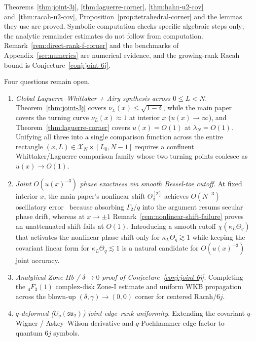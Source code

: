\documentclass[11pt]{article}
\theoremstyle{definition}
\theoremstyle{remark}
\newcommand{\cX}{\mathcal{X}}
\renewcommand{\_}{\oldunderscore\penalty0\hskip0pt\relax}
\begin{document}
Theorems~\ref{thm:joint-3j}, \ref{thm:laguerre-corner}, \ref{thm:hahn-u2-cov} and~\ref{thm:racah-u2-cov},
  Proposition~\ref{prop:tetrahedral-corner} and the lemmas they use are proved. Symbolic computation checks specific algebraic
  steps only; the analytic remainder estimates do not follow from computation. Remark~\ref{rem:direct-rank-f-corner} and the
  benchmarks of Appendix~\ref{sec:numerics} are numerical evidence, and the growing-rank Racah bound is
  Conjecture~\ref{conj:joint-6j}.

Four questions remain open.
\begin{enumerate}[leftmargin=2em,itemsep=2pt]
\item \emph{Global Laguerre--Whittaker + Airy synthesis across $0\le L<N$}.
  Theorem~\ref{thm:joint-3j} covers $\nu_L(x)\le\sqrt{1-\delta}$, while the main paper~\cite[Theorem~4.6]{LewisGrowingRank} covers the
  turning curve $\nu_L(x)\approx 1$ at interior $x$ ($u(x)\to\infty$), and Theorem~\ref{thm:laguerre-corner} covers $u(x)=O(1)$
  at $\lambda_N=O(1)$. Unifying all three into a single comparison function across the entire rectangle
  $(x,L)\in\cX_N\times[L_0,N-1]$ requires a confluent Whittaker/Laguerre comparison family whose two turning points coalesce as
  $u(x)\to O(1)$.
\item \emph{Joint $O(u(x)^{-3})$ phase exactness via smooth Bessel-toe cutoff}. At fixed interior
  $x$, the main paper's nonlinear shift $\Theta_q^{[2]}$ achieves $O(N^{-3})$ oscillatory error~\cite[Corollary~4.4]{LewisGrowingRank}
  because absorbing $\Gamma_2/q$ into the argument resums secular phase drift, whereas at $x\to\pm 1$
  Remark~\ref{rem:nonlinear-shift-failure} proves an unattenuated shift fails at $O(1)$. Introducing a smooth cutoff
  $\chi(\kappa_L\Theta_q)$ that activates the nonlinear phase shift only for $\kappa_L\Theta_q\gtrsim 1$ while keeping the
  covariant linear form for $\kappa_L\Theta_q\lesssim 1$ is a natural candidate for $O(u(x)^{-3})$ joint accuracy.
\item \emph{Analytical Zone-IIb / $\delta\to 0$ proof of Conjecture~\ref{conj:joint-6j}}.
  Completing the ${}_4F_3(1)$ complex-disk Zone-I estimate and uniform WKB propagation across the blown-up
  $(\delta,\gamma)\to(0,0)$ corner for centered Racah/$6j$.
\item \emph{$q$-deformed ($U_q(\mathfrak{su}_2)$) joint edge--rank uniformity}. Extending the
  covariant $q$-Wigner / Askey--Wilson derivative and $q$-Pochhammer edge factor to quantum $6j$ symbols.
\end{enumerate}
\end{document}

